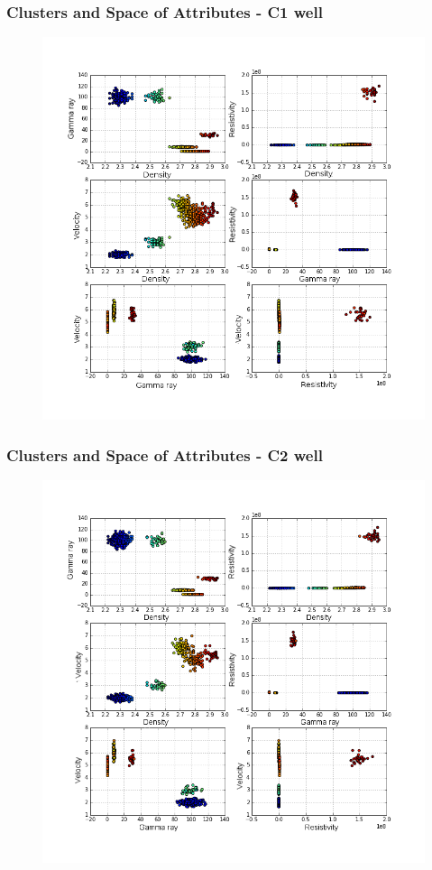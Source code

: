 \documentclass[aspectratio=10]{beamer} %
\begin{document}
\begin{frame}
\frametitle{Clusters and Space of Attributes - C1 well}

\begin{figure}
	\includegraphics[scale=0.29]{Imagens/cluterpocoC1.png}
\end{figure}

\end{frame}

\begin{frame}
\frametitle{Clusters and Space of Attributes - C2 well}

\begin{figure}
	\includegraphics[scale=0.29]{Imagens/cluterpocoC2.png}
\end{figure}

\end{frame}
\end{document}

